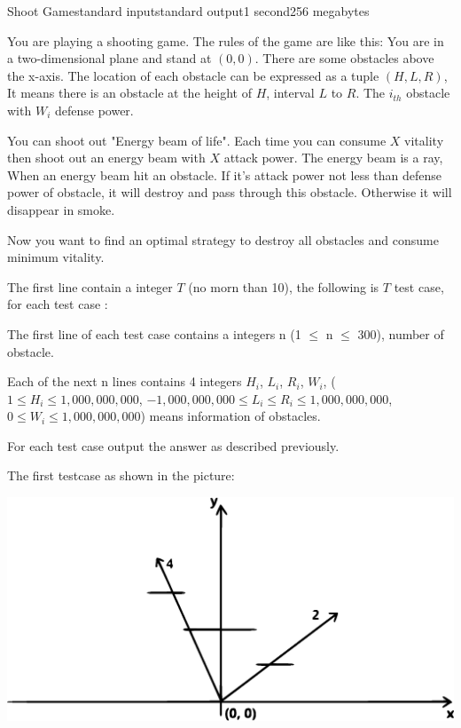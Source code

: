 \begin{problem}{Shoot Game}{standard input}{standard output}{1 second}{256 megabytes}

You are playing a shooting game. The rules of the game are like this: You are in a two-dimensional plane and stand at $(0, 0)$. There are some obstacles above the x-axis. The location of each obstacle can be expressed as a tuple $(H, L, R)$, It means there is an obstacle at the height of $H$, interval $L$ to $R$. The $i_{th}$ obstacle with $W_i$ defense power. 

You can shoot out "Energy beam of life". Each time you can consume $X$ vitality then shoot out an energy beam with $X$ attack power. The energy beam is a ray, When an energy beam hit an obstacle. If it's attack power not less than defense power of obstacle, it will destroy and pass through this obstacle. Otherwise it will disappear in smoke.

Now you want to find an optimal strategy to destroy all obstacles and consume minimum vitality.

\InputFile
The first line contain a integer $T$ (no morn than 10), the following is $T$ test case, for each test case :

The first line of each test case contains a integers n (1 $\le$ n $\le$ 300), number of obstacle. 

Each of the next n lines contains 4 integers $H_i$, $L_i$, $R_i$, $W_i$, ($1\le H_i\le 1,000,000,000$, $-1,000,000,000\le L_i\le R_i\le 1,000,000,000$, $0\le W_i\le 1,000,000,000$) means information of obstacles. 

\OutputFile
For each test case output the answer as described previously.

\Example

\begin{example}
%
\end{example}

\Note
The first testcase as shown in the picture:

\centerline{\includegraphics[scale=0.4]{shootgame.eps}}

\end{problem}

